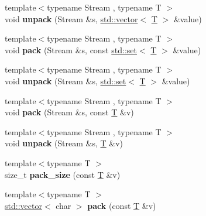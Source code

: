 \begin{DoxyCompactItemize}
\item 
\mbox{\label{namespacefc_1_1raw_afc280229863f36d108c595d73f0c4787}} 
{\footnotesize template$<$typename Stream , typename T $>$ }\\void {\bfseries unpack} (Stream \&s, \mbox{\hyperlink{classstd_1_1vector}{std\+::vector}}$<$ \mbox{\hyperlink{struct_t}{T}} $>$ \&value)
\item 
\mbox{\label{namespacefc_1_1raw_adb38138cfe5cf6f5f7ee63fca71dd2f4}} 
{\footnotesize template$<$typename Stream , typename T $>$ }\\void {\bfseries pack} (Stream \&s, const \mbox{\hyperlink{classstd_1_1set}{std\+::set}}$<$ \mbox{\hyperlink{struct_t}{T}} $>$ \&value)
\item 
\mbox{\label{namespacefc_1_1raw_a311ce8a6c6bf552061e282ea7d3a7147}} 
{\footnotesize template$<$typename Stream , typename T $>$ }\\void {\bfseries unpack} (Stream \&s, \mbox{\hyperlink{classstd_1_1set}{std\+::set}}$<$ \mbox{\hyperlink{struct_t}{T}} $>$ \&value)
\item 
\mbox{\label{namespacefc_1_1raw_ad3aa653b2a5c5115fe1480da7e33e052}} 
{\footnotesize template$<$typename Stream , typename T $>$ }\\void {\bfseries pack} (Stream \&s, const \mbox{\hyperlink{struct_t}{T}} \&v)
\item 
\mbox{\label{namespacefc_1_1raw_af687cfa28fad98a060654d9039d0bf2b}} 
{\footnotesize template$<$typename Stream , typename T $>$ }\\void {\bfseries unpack} (Stream \&s, \mbox{\hyperlink{struct_t}{T}} \&v)
\item 
\mbox{\label{namespacefc_1_1raw_a64937a5adc8041247f7007882224e225}} 
{\footnotesize template$<$typename T $>$ }\\size\+\_\+t {\bfseries pack\+\_\+size} (const \mbox{\hyperlink{struct_t}{T}} \&v)
\item 
\mbox{\label{namespacefc_1_1raw_a74a2d3576c1d8bc03ebfb3fbfcc9f2b7}} 
{\footnotesize template$<$typename T $>$ }\\\mbox{\hyperlink{classstd_1_1vector}{std\+::vector}}$<$ char $>$ {\bfseries pack} (const \mbox{\hyperlink{struct_t}{T}} \&v)

\end{DoxyCompactItemize}
